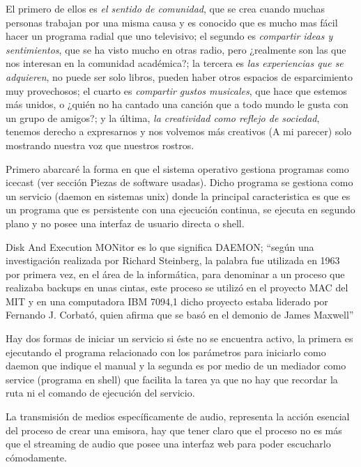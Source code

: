 \begin{multicols}{2}
El primero de ellos es {\em el sentido de comunidad}, que se crea cuando muchas personas trabajan por una misma causa y es conocido que es mucho mas fácil hacer un programa radial que uno televisivo; el segundo es {\em compartir ideas y sentimientos}, que se ha visto mucho en otras radio, pero ¿realmente son las que nos interesan en la comunidad académica?; la tercera es {\em las experiencias que se adquieren}, no puede ser solo libros, pueden haber otros espacios de esparcimiento muy provechosos; el cuarto es {\em compartir gustos musicales}, que hace que estemos más unidos, o ¿quién no ha cantado una canción que a todo mundo le gusta con un grupo de amigos?; y la última, {\em la creatividad como reflejo de sociedad}, tenemos derecho a expresarnos y nos volvemos más creativos (A mi parecer) solo mostrando nuestra voz que nuestros rostros.


Primero abarcaré la forma en que el sistema operativo gestiona programas como icecast (ver sección Piezas de software usadas). Dicho programa se gestiona como un servicio (daemon en sistemas unix) donde la principal caracteristica es que es un programa que es persistente con una ejecución continua, se ejecuta en segundo plano y no posee una interfaz de usuario directa o shell.

Disk And Execution MONitor es lo que significa DAEMON; ``según una investigación realizada por Richard Steinberg, la palabra fue utilizada en 1963 por primera vez, en el área de la informática, para denominar a un proceso que realizaba backups en unas cintas, este proceso se utilizó en el proyecto MAC del MIT y en una computadora IBM 7094,1 dicho proyecto estaba liderado por Fernando J. Corbató, quien afirma que se basó en el demonio de James Maxwell''\cite {ref1}

Hay dos formas de iniciar un servicio si éste no se encuentra activo, la primera es ejecutando el programa relacionado con los parámetros para iniciarlo como daemon que indique el manual y la segunda es por medio de un mediador como service (programa en shell) que facilita la tarea ya que no hay que recordar la ruta ni el comando de ejecución del servicio.


La transmisión de medios específicamente de audio, representa la acción esencial del proceso de crear una emisora, hay que tener claro que el proceso no es más que el streaming de audio que posee una interfaz web para poder escucharlo cómodamente.


\end{multicols}
